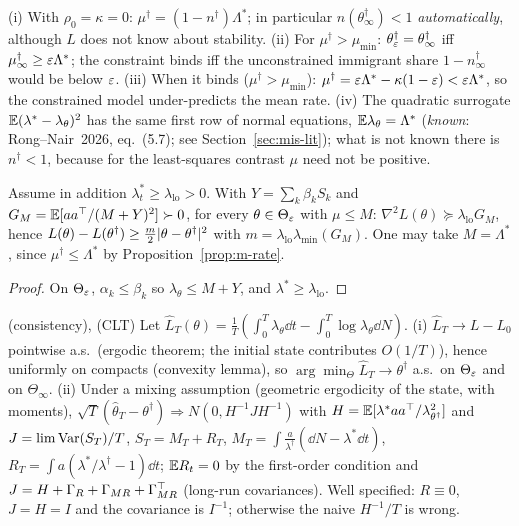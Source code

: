\begin{corollary}\label{cor:m-binding}\Pt{}
(i) With $\rho_0=\kappa=0$: $\mu^\dagger=(1-n^\dagger)\Lambda^*$; in particular $n(\theta^\dagger_\infty)<1$ \emph{automatically}, although $L$ does not know about stability.
(ii) For $\mu^\dagger>\mu_{\min}$: $\theta^\dagger_\varepsilon=\theta^\dagger_\infty$ iff $\mu^\dagger_\infty\ge\varepsilon\Lambda^*$; the constraint binds iff the unconstrained immigrant share $1-n^\dagger_\infty$ would be below $\varepsilon$.
(iii) When it binds ($\mu^\dagger>\mu_{\min}$): $\mu^\dagger=\varepsilon\Lambda^*-\kappa(1-\varepsilon)<\varepsilon\Lambda^*$, so the constrained model under-predicts the mean rate.
(iv) The quadratic surrogate $\mathbb{E}(\lambda^*-\lambda_\theta)^2$ has the same first row of normal equations, $\mathbb{E}\lambda_\theta=\Lambda^*$ (\emph{known}: Rong--Nair~2026, eq.~(5.7); see Section~\ref{sec:mis-lit}); what is not known there is $n^\dagger<1$, because for the least-squares contrast $\mu$ need not be positive.
\end{corollary}

\begin{proposition}\label{prop:m-sc}\Pt{}
Assume in addition $\lambda^*_t\ge\lambda_{\mathrm{lo}}>0$. With $Y=\sum_k\beta_kS_k$ and $G_M=\mathbb{E}[aa^{\top}/(M+Y)^2]\succ0$,
for every $\theta\in\Theta_\varepsilon$ with $\mu\le M$: $\nabla^2L(\theta)\succeq\lambda_{\mathrm{lo}}G_M$, hence $L(\theta)-L(\theta^\dagger)\ge\tfrac m2\lvert \theta-\theta^\dagger\rvert^2$ with $m=\lambda_{\mathrm{lo}}\lambda_{\min}(G_M)$. One may take $M=\Lambda^*$, since $\mu^\dagger\le\Lambda^*$ by Proposition~\ref{prop:m-rate}.
\end{proposition}
\begin{proof}
On $\Theta_\varepsilon$, $\alpha_k\le\beta_k$ so $\lambda_\theta\le M+Y$, and $\lambda^*\ge\lambda_{\mathrm{lo}}$.
\end{proof}

\begin{proposition}\label{prop:m-sandwich}\Pt{} (consistency), \Ps{} (CLT)
Let $\hat L_T(\theta)=\tfrac1T(\int_0^T\lambda_\theta\dd t-\int_0^T\log\lambda_\theta\dd N)$.
(i) $\hat L_T\to L-L_0$ pointwise a.s.\ (ergodic theorem; the initial state contributes $O(1/T)$), hence uniformly on compacts (convexity lemma), so $\arg\min_{\Theta}\hat L_T\to\theta^\dagger$ a.s.\ on $\Theta_\varepsilon$ and on $\Theta_\infty$.
(ii) Under a mixing assumption (geometric ergodicity of the state, with moments), $\sqrt T(\hat\theta_T-\theta^\dagger)\Rightarrow N(0,H^{-1}JH^{-1})$ with $H=\mathbb{E}[\lambda^*aa^{\top}/\lambda_{\theta^\dagger}^2]$ and $J=\lim\operatorname{Var}(S_T)/T$, $S_T=M_T+R_T$, $M_T=\int\frac{a}{\lambda^\dagger}(\dd N-\lambda^*\dd t)$, $R_T=\int a(\lambda^*/\lambda^\dagger-1)\dd t$; $\mathbb{E} R_t=0$ by the first-order condition and $J=H+\Gamma_R+\Gamma_{MR}+\Gamma_{MR}^{\top}$ (long-run covariances). Well specified: $R\equiv0$, $J=H=I$ and the covariance is $I^{-1}$; otherwise the naive $H^{-1}/T$ is wrong.
\end{proposition}

